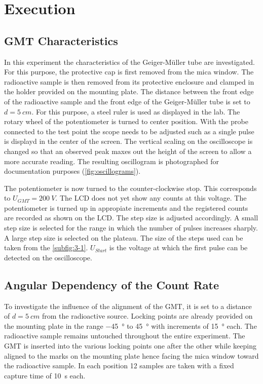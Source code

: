 \chapter{Execution}
\section{GMT Characteristics}
In this experiment the characteristics of the Geiger-Müller tube are investigated. For this purpose, the protective cap
is first removed from the mica window. The radioactive sample is then removed from its protective enclosure and clamped
in the holder provided on the mounting plate. The distance between the front edge of the radioactive sample and the front edge
of the Geiger-Müller tube is set to \(d = \SI[]{5}[]{cm}\). For this purpose, a steel ruler is used as displayed in the
lab. The rotary wheel of the potentiometer is turned to center position. With the probe connected to the test point the
scope needs to be adjusted such as a single pulse is displayd in the center of the screen. The vertical
scaling on the oscilloscope is changed so that an observed peak maxes out the height of the screen to allow a more
accurate reading. The resulting oscillogram is photographed for documentation purposes (\cref{fig:oscillograms}).\par
The potentiometer is now turned to the counter-clockwise stop. This corresponds to \(U_{GMT} = \SI[]{200}[]{V}\). The LCD
does not yet show any counts at this voltage. The potentiometer is turned up in appropiate increments and the registered
counts are recorded as shown on the LCD. The step size is adjusted accordingly. A small step size is selected for the
range in which the number of pulses increases sharply. A large step size is selected on the plateau. The size of the
steps used can be taken from the \cref{subfig:3-1}. \(U_{Start}\) is the voltage at which the first pulse can be detected %
on the oscilloscope.
%
\section{Angular Dependency of the Count Rate}
To investigate the influence of the alignment of the GMT, it is set to a distance of \(d = \SI{5}{cm}\) from the
radioactive source. Locking points are already provided on the mounting plate in the range \SI[]{-45}[]{\degree} to
\SI[]{+45}[]{\degree} with increments of \SI[]{15}[]{\degree} each. The radioactive sample remains untouched throughout
the entire experiment. The GMT is inserted into the various locking points one after the other while keeping aligned to
the marks on the mounting plate hence facing the mica window toward the radioactive sample. In each position 12 samples
are taken with a fixed capture time of \SI[]{10}[]{s} each.
%
